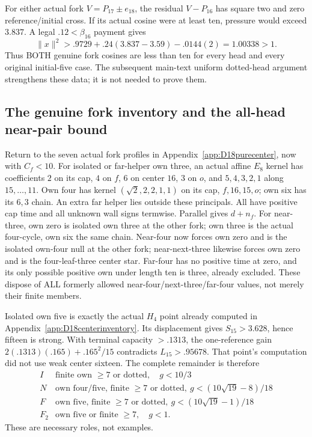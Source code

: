 \documentclass[11pt]{article}
\theoremstyle{definition}
\theoremstyle{remark}
\newcommand{\norm}[1]{\lVert #1\rVert}
\begin{document}
For either actual fork \(V=P_{17}\pm e_{18}\), the residual
\(V-P_{16}\) has square two and zero reference/initial cross.
If its actual cosine were at least ten, pressure would exceed
\(3.837\). A legal \(.12<\beta_{16}\) payment gives
\[
 \norm x^2>.9729+.24(3.837-3.59)-.0144(2)
 =1.00338>1 .
\]
Thus BOTH genuine fork cosines are less than ten for every head
and every original initial-five case.
The subsequent main-text uniform dotted-head argument strengthens
these data; it is not needed to prove them.

\subsection{The genuine fork inventory and the all-head near-pair bound}
\label{app:D18forkinventory}
Return to the seven actual fork profiles in
Appendix~\ref{app:D18purecenter}, now with \(C_f<10\).
For isolated or far-helper own three, an actual affine \(E_8\)
kernel has coefficients \(2\) on its cap, \(4\) on \(f\),
\(6\) on center \(16\), \(3\) on \(o\), and
\(5,4,3,2,1\) along \(15,\ldots,11\).
Own four has kernel \((\sqrt2,2,2,1,1)\)
on its cap, \(f,16,15,o\); own six has its \(6,3\) chain.
An extra far helper lies outside these principals.
All have positive cap time and all unknown wall signs termwise.
Parallel gives \(d+n_f\).
For near-three, own zero is isolated own three at the other fork;
own three is the actual four-cycle, own six the same chain.
Near-four now forces own zero and is the isolated own-four null
at the other fork; near-next-three likewise forces own zero and
is the four-leaf-three center star.
Far-four has no positive time at zero, and its only possible
positive own under length ten is three, already excluded.
These dispose of ALL formerly allowed near-four/next-three/far-four
values, not merely their finite members.

Isolated own five is exactly the actual \(H_4\) point already
computed in Appendix~\ref{app:D18centerinventory}.
Its displacement gives \(S_{15}>3.628\), hence fifteen is strong.
With terminal capacity \(>.1313\), the one-reference gain
\(2(.1313)(.165)+.165^2/15\) contradicts \(L_{15}>.95678\).
That point's computation did not use weak center sixteen.
The complete remainder is therefore
\[
\begin{array}{c|c}
I&\text{finite own }\geq7\text{ or dotted},\quad g<10/3\\
N&\text{own four/five, finite }\geq7\text{ or dotted},\
 g<(10\sqrt{19}-8)/18\\
F&\text{own five, finite }\geq7\text{ or dotted},\
 g<(10\sqrt{19}-1)/18\\
F_2&\text{own five or finite }\geq7,\quad g<1 .
\end{array}
\]
These are necessary roles, not examples.
\end{document}
